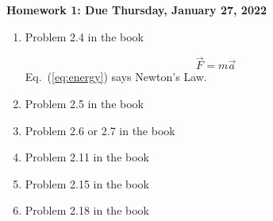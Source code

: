 \documentclass[11pt]{article}
\begin{document}
\newcommand{\problem}[1]{%
\item {#1}
}
\newcommand{\probl}[1]{\label{#1}}
\def\be{\begin{equation}}
\def\ee{\end{equation}}
\def\bea{\begin{eqnarray}}
\def\eea{\end{eqnarray}}
\newcommand{\vs}{\nonumber\\}
\def\across{a^\times}
\def\tcross{T^\times}
\def\ccross{C^\times}
\newcommand{\ec}[1]{Eq.~(\ref{eq:#1})}
\newcommand{\eec}[2]{Eqs.~(\ref{eq:#1}) and (\ref{eq:#2})}
\newcommand{\Ec}[1]{(\ref{eq:#1})}
\newcommand{\eql}[1]{\label{eq:#1}}
\newcommand{\sfig}[2]{
\texttt{[image: \#1]}
        }
\newcommand{\sfigr}[2]{
\texttt{[image: \#1]}
        }
\newcommand{\sfigra}[2]{
\texttt{[image: \#1]}
        }
\newcommand{\Sfig}[2]{
   \begin{figure}[thbp]
   \begin{center}
    \sfig{#1.pdf}{0.5\columnwidth}
    \caption{{\small #2}}
    \label{fig:#1}
     \end{center}
   \end{figure}
}
\newcommand\dirac{\delta_D}
\newcommand{\rf}[1]{\ref{fig:#1}}
\newcommand\rhoc{\rho_{\rm cr}}
\newcommand\zs{D_S}
\newcommand\dts{\Delta t_{\rm Sh}}
\newcommand\zle{D_L}
\newcommand\zsl{D_{SL}}
\newcommand\sh{\gamma}
\newcommand\surb{\mathcal{S}}
\newcommand\psf{\mathcal{P}}
\newcommand\spsf{\sigma_{\rm PSF}}
\newcommand\bei{\begin{itemize}}
\newcommand\eei{\end{itemize}}
\begin{centering}
{\bf Homework 1: Due Thursday, January 27, 2022}
\end{centering}

\begin{enumerate}

\problem{Problem 2.4 in the book}
\be
\vec F = m\vec a \eql{energy} \ee
\ec{energy} says Newton's Law.
\problem{Problem 2.5 in the book}
\problem{Problem 2.6 or 2.7 in the book}
\problem{Problem 2.11 in the book}
\problem{Problem 2.15 in the book}
\problem{Problem 2.18 in the book}

\end{enumerate}
\end{document}
